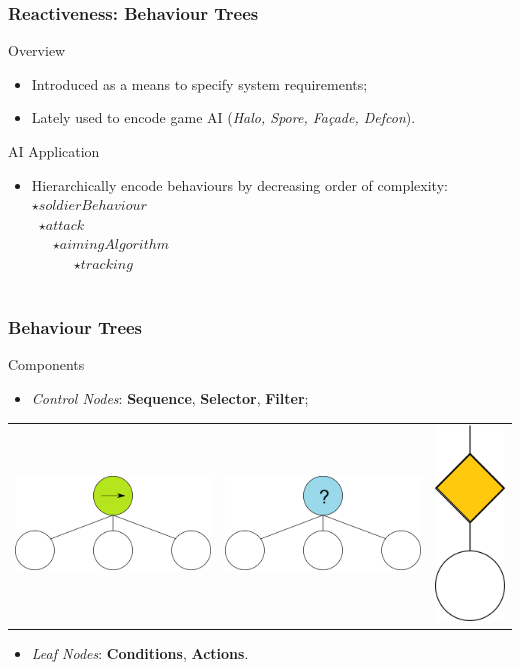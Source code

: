 \documentclass{beamer}
\begin{document}
\begin{frame}{}
	\frametitle{Reactiveness: Behaviour Trees}
	\begin{block}{Overview}
		\begin{itemize}
			\item Introduced as a means to specify system requirements;
			\item Lately used to encode game AI (\textit{Halo, Spore, Fa\c{c}ade, Defcon}).
		\end{itemize}
	\end{block}
	\begin{block}{AI Application}
		\begin{itemize}
			\item Hierarchically encode behaviours by decreasing order of complexity:
			$\star soldierBehaviour$\\
			\footnotesize{\ $\star attack$}\\
			\scriptsize{\ \ \ $\star aimingAlgorithm$}\\
			\tiny{\ \ \ \ \ \ $\star tracking$}\\
			\Tiny{\ \ \ \ \ \ \ \ \ \ldots}\\
		\end{itemize}
	\end{block}
	\vfill
\end{frame}

\begin{frame}{}
	\frametitle{Behaviour Trees}
	\begin{block}{Components}
		\begin{itemize}
			\item \textit{Control Nodes}: \textbf{Sequence}, \textbf{Selector}, \textbf{Filter};
		\end{itemize}
	\begin{center}
		\begin{tabular}{ccc}
		\includegraphics[width=.23\textwidth]{sequence}&
		\includegraphics[width=.23\textwidth]{selector}&
		\includegraphics[width=.048\textwidth]{filter}\\
		\end{tabular}
	\end{center}
		\begin{itemize}
			\item \textit{Leaf Nodes}: \textbf{Conditions}, \textbf{Actions}.
		\end{itemize}
	\end{block}
	\vfill
\end{frame}
\end{document}
